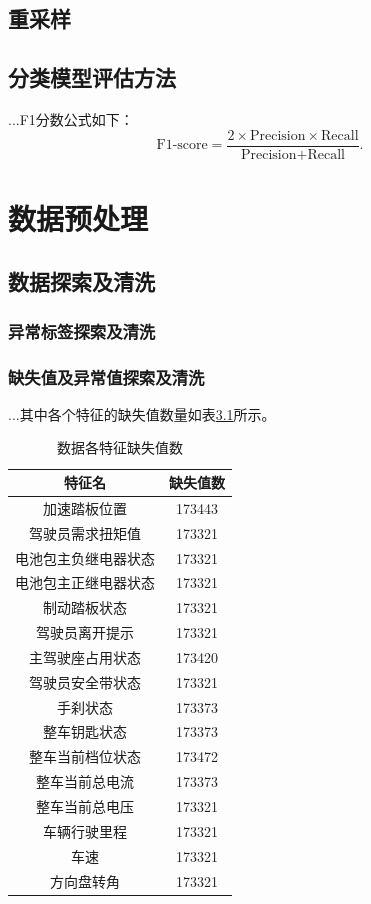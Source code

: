 \section{重采样}

\section{分类模型评估方法}
...F1分数公式如下：
\begin{equation}
    \text{F1-score}=\frac{2\times \text{Precision}\times \text{Recall}}{\text{Precision}+\text{Recall}}.
\end{equation}

\chapter{数据预处理}
\section{数据探索及清洗}
\subsection{异常标签探索及清洗}
\subsection{缺失值及异常值探索及清洗}
...其中各个特征的缺失值数量如表\ref{tab:env}所示。

\begin{table}[H]
\centering
\caption{数据各特征缺失值数}
\label{tab:env}
\begin{tabular}{cc}
\toprule
特征名 & 缺失值数\\
\midrule
加速踏板位置 & 173443\\
驾驶员需求扭矩值 & 173321\\
电池包主负继电器状态 & 173321\\
电池包主正继电器状态 & 173321\\
制动踏板状态 & 173321\\
驾驶员离开提示 & 173321\\
主驾驶座占用状态 & 173420\\
驾驶员安全带状态 & 173321\\
手刹状态 & 173373\\
整车钥匙状态 & 173373\\
整车当前档位状态 & 173472\\
整车当前总电流 & 173373\\
整车当前总电压 & 173321\\
车辆行驶里程 & 173321\\
车速 & 173321\\
方向盘转角 & 173321\\
\bottomrule
\end{tabular}
\end{table}

